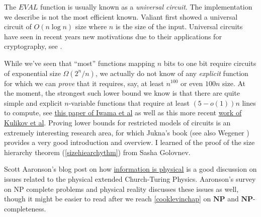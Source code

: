 The \(\ensuremath{\mathit{EVAL}}\) function is usually known as a
\emph{universal circuit}. The implementation we describe is not the most
efficient known. Valiant \cite{Valiant1976} first showed a universal
circuit of \(O(n \log n)\) size where \(n\) is the size of the input.
Universal circuits have seen in recent years new motivations due to
their applications for cryptography, see
\cite{lipmaa2016valiant, Gunther2017} .

While we've seen that ``most'' functions mapping \(n\) bits to one bit
require circuits of exponential size \(\Omega(2^n/n)\), we actually do
not know of any \emph{explicit} function for which we can \emph{prove}
that it requires, say, at least \(n^{100}\) or even \(100n\) size. At
the moment, the strongest such lower bound we know is that there are
quite simple and explicit \(n\)-variable functions that require at least
\((5-o(1))n\) lines to compute, see
\href{http://www.wisdom.weizmann.ac.il/~ranraz/publications/P5nlb.pdf}{this
paper of Iwama et al} as well as this more recent
\href{http://logic.pdmi.ras.ru/~kulikov/papers/2012_5n_lower_bound_cie.pdf}{work
of Kulikov et al}. Proving lower bounds for restricted models of
circuits is an extremely interesting research area, for which Jukna's
book \cite{Jukna12} (see also Wegener \cite{wegener1987complexity})
provides a very good introduction and overview. I learned of the proof
of the size hierarchy theorem (\cref{sizehiearchythm}) from Sasha
Golovnev.

Scott Aaronson's blog post on how
\href{http://www.scottaaronson.com/blog/?p=3327}{information is
physical} is a good discussion on issues related to the physical
extended Church-Turing Physics. Aaronson's survey on NP complete
problems and physical reality \cite{aaronson2005physicalreality}
discusses these issues as well, though it might be easier to read after
we reach \cref{cooklevinchap} on \(\mathbf{NP}\) and
\(\mathbf{NP}\)-completeness.
